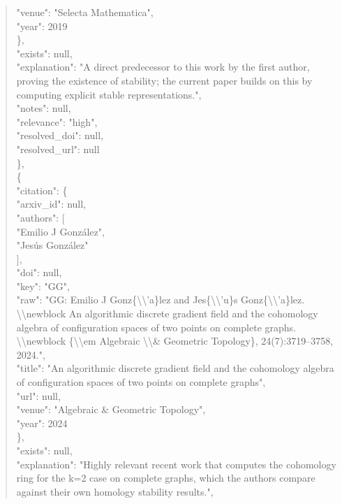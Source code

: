 \documentclass[11pt]{article}
\begin{document}
\begin{quote}
        "venue": "Selecta Mathematica",\\
        "year": 2019\\
      \},\\
      "exists": null,\\
      "explanation": "A direct predecessor to this work by the first author, proving the existence of stability; the current paper builds on this by computing explicit stable representations.",\\
      "notes": null,\\
      "relevance": "high",\\
      "resolved\_doi": null,\\
      "resolved\_url": null\\
    \},\\
    \{\\
      "citation": \{\\
        "arxiv\_id": null,\\
        "authors": [\\
          "Emilio J González",\\
          "Jesús González"\\
        ],\\
        "doi": null,\\
        "key": "GG",\\
        "raw": "GG: Emilio J Gonz\{\textbackslash{}\textbackslash{}'a\}lez and Jes\{\textbackslash{}\textbackslash{}'u\}s Gonz\{\textbackslash{}\textbackslash{}'a\}lez. \textbackslash{}\textbackslash{}newblock An algorithmic discrete gradient field and the cohomology algebra of configuration spaces of two points on complete graphs. \textbackslash{}\textbackslash{}newblock \{\textbackslash{}\textbackslash{}em Algebraic \textbackslash{}\textbackslash{}\& Geometric Topology\}, 24(7):3719--3758, 2024.",\\
        "title": "An algorithmic discrete gradient field and the cohomology algebra of configuration spaces of two points on complete graphs",\\
        "url": null,\\
        "venue": "Algebraic \& Geometric Topology",\\
        "year": 2024\\
      \},\\
      "exists": null,\\
      "explanation": "Highly relevant recent work that computes the cohomology ring for the k=2 case on complete graphs, which the authors compare against their own homology stability results.",\\

\end{quote}
\end{document}
